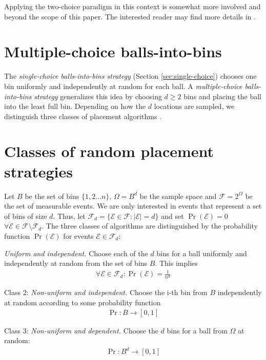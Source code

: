 \documentclass[a4paper,12pt]{article}
\begin{document}
Applying the two-choice paradigm in this context is somewhat more involved and beyond the scope of this paper. The interested reader may find more details in \cite{CMM+98}.

\section{Multiple-choice balls-into-bins}
\label{sec:multiple-choice}
The \emph{single-choice balls-into-bins strategy} (Section \ref{sec:single-choice}) chooses one bin uniformly and independently at random for each ball. A \emph{multiple-choice balls-into-bins strategy} generalizes this idea by  choosing $d \geq 2$ bins and placing the ball into the least full bin. Depending on how the $d$ locations are sampled, we distinguish three classes of placement algorithms \cite{VOC03}. 

\section{Classes of random placement strategies}
\label{sec:classesOfPlacement}
Let $B$ be the set of bins $\{1,2...n\}$, $\Omega = B^{d}$ be the sample space and $\mathcal{F} = 2^{\Omega}$ be the set of measurable events. We are only interested in events that represent a set of bins of size $d$. Thus, let $\mathcal{F}_d = \{\mathcal{E} \in \mathcal{F}: \left\vert \mathcal{E} \right\vert = d\}$ and set $\Pr\left(\mathcal{E}  \right) = 0$  $\forall \mathcal{E} \in \mathcal{F} \setminus \mathcal{F}_d $. The three classes of algorithms are distinguished by the probability function $\Pr\left(\mathcal{E}\right)$ for events $\mathcal{E} \in \mathcal{F}_d$:
\begin{compactitem}
\item  \emph{Uniform and independent.} Choose each of the $d$ bins for a ball uniformly and independently at random from the set of bins $B$. This implies 
\begin{align*}
\forall \mathcal{E} \in \mathcal{F}_d: \Pr\left(\mathcal{E}\right) = \frac{1}{n ^{d}}
\end{align*}
\item Class 2: \emph{Non-uniform and independent.} Choose the i-th bin from $B$ independently at random according to some probability function
\begin{align*}
\Pr: B \rightarrow \left[0,1\right]
\end{align*}

\item Class 3: \emph{Non-uniform and dependent.} Choose the $d$ bins for a ball from $\Omega$ at random:
\begin{align*}
\Pr: B^{d} \rightarrow \left[0,1\right]
\end{align*}
\end{compactitem} 
 
\end{document}

